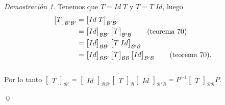 \documentclass{article}
\theoremstyle{definition}
\theoremstyle{definition}
\theoremstyle{remark}
\newtheorem*{demo}{Demostración}
\begin{document}
\begin{demo}
  Tenemos que $T=Id \; T$ \; y \; $T=T \; Id$, luego \begin{align}
    \begin{bmatrix}T \end{bmatrix}_{\mathcal{B'}\mathcal{B'}} &= \begin{bmatrix}Id \; T \end{bmatrix}_{\mathcal{B'}\mathcal{B'}} \notag  \\
                 &= \begin{bmatrix}Id \end{bmatrix}_{\mathcal{B}\mathcal{B'}}\begin{bmatrix}T\end{bmatrix}_{\mathcal{B'}\mathcal{B}}\tag{teorema 70} \\
                 &= \begin{bmatrix}Id \end{bmatrix}_{\mathcal{B}\mathcal{B'}}\begin{bmatrix}T \; Id\end{bmatrix}_{\mathcal{B'}\mathcal{B}} \notag \\
                 &= \begin{bmatrix}Id \end{bmatrix}_{\mathcal{B}\mathcal{B'}}\begin{bmatrix}T\end{bmatrix}_{\mathcal{B}\mathcal{B}}\begin{bmatrix}Id\end{bmatrix}_{\mathcal{B}'\mathcal{B}} \tag{teorema 70}. 
  \end{align} \\
  Por lo tanto $\begin{bmatrix}T\end{bmatrix}_{\mathcal{B'}}=\begin{bmatrix}Id\end{bmatrix}_{\mathcal{B}\mathcal{B'}}\begin{bmatrix}T\end{bmatrix}_{\mathcal{B}}\begin{bmatrix}Id\end{bmatrix}_{\mathcal{B'}\mathcal{B}}=P^{-1}\begin{bmatrix}T\end{bmatrix}_{\mathcal{B}\mathcal{B}}P$.
\end{demo}
\qed \\\\ 
\end{document}

